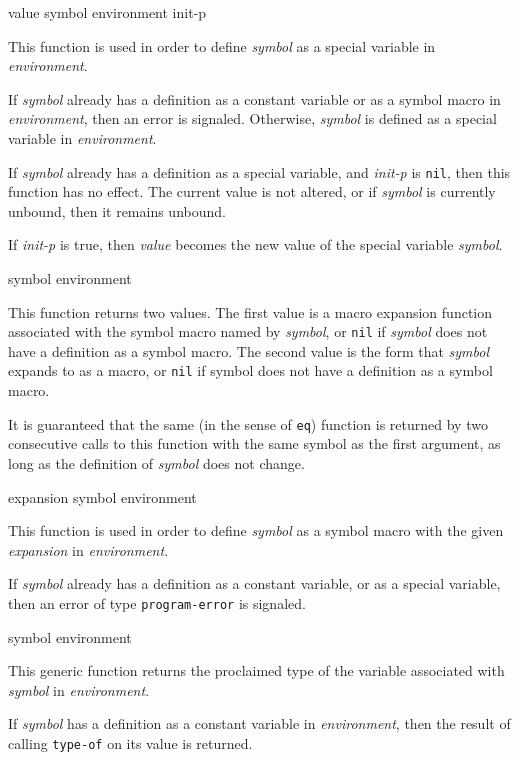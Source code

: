  {value symbol environment init-p}

This function is used in order to define \textit{symbol} as a special
variable in \textit{environment}.

If \textit{symbol} already has a definition as a constant variable or
as a symbol macro in \textit{environment}, then an error is signaled.
Otherwise, \textit{symbol} is defined as a special variable in
\textit{environment}.

If \textit{symbol} already has a definition as a special variable, and
\textit{init-p} is \texttt{nil}, then this function has no effect.
The current value is not altered, or if \textit{symbol} is currently
unbound, then it remains unbound.

If \textit{init-p} is true, then \textit{value} becomes the new value
of the special variable \textit{symbol}.

 {symbol environment}

This function returns two values.  The first value is a macro
expansion function associated with the symbol macro named by
\textit{symbol}, or \texttt{nil} if \textit{symbol} does not have a
definition as a symbol macro.  The second value is the form that
\textit{symbol} expands to as a macro, or \texttt{nil} if symbol does
not have a definition as a symbol macro.

It is guaranteed that the same (in the sense of \texttt{eq}) function
is returned by two consecutive calls to this function with the same
symbol as the first argument, as long as the definition of
\textit{symbol} does not change.

 {expansion symbol environment}

This function is used in order to define \textit{symbol} as a symbol
macro with the given \textit{expansion} in \textit{environment}.

If \textit{symbol} already has a definition as a constant variable, or
as a special variable, then an error of type \texttt{program-error} is
signaled.

 {symbol environment}

This generic function returns the proclaimed type of the variable
associated with \textit{symbol} in \textit{environment}.

If \textit{symbol} has a definition as a constant variable in
\textit{environment}, then the result of calling \texttt{type-of} on
its value is returned.

